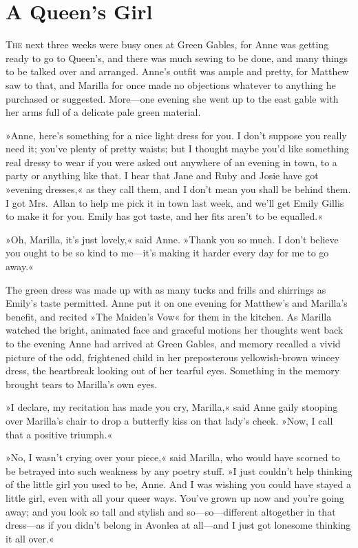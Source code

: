 \chapter{A Queen's Girl}

\lettrine[lines=4]{T}{he} next three weeks were busy ones at Green Gables, for Anne was getting ready to go to Queen's, and there was much sewing to be done, and many things to be talked over and arranged. Anne's outfit was ample and pretty, for Matthew saw to that, and Marilla for once made no objections whatever to anything he purchased or suggested. More—one evening she went up to the east gable with her arms full of a delicate pale green material.

»Anne, here's something for a nice light dress for you. I don't suppose you really need it; you've plenty of pretty waists; but I thought maybe you'd like something real dressy to wear if you were asked out anywhere of an evening in town, to a party or anything like that. I hear that Jane and Ruby and Josie have got »evening dresses,« as they call them, and I don't mean you shall be behind them. I got Mrs.~Allan to help me pick it in town last week, and we'll get Emily Gillis to make it for you. Emily has got taste, and her fits aren't to be equalled.«

»Oh, Marilla, it's just lovely,« said Anne. »Thank you so much. I don't believe you ought to be so kind to me—it's making it harder every day for me to go away.«

The green dress was made up with as many tucks and frills and shirrings as Emily's taste permitted. Anne put it on one evening for Matthew's and Marilla's benefit, and recited »The Maiden's Vow« for them in the kitchen. As Marilla watched the bright, animated face and graceful motions her thoughts went back to the evening Anne had arrived at Green Gables, and memory recalled a vivid picture of the odd, frightened child in her preposterous yellowish-brown wincey dress, the heartbreak looking out of her tearful eyes. Something in the memory brought tears to Marilla's own eyes.

»I declare, my recitation has made you cry, Marilla,« said Anne gaily stooping over Marilla's chair to drop a butterfly kiss on that lady's cheek. »Now, I call that a positive triumph.«

»No, I wasn't crying over your piece,« said Marilla, who would have scorned to be betrayed into such weakness by any poetry stuff. »I just couldn't help thinking of the little girl you used to be, Anne. And I was wishing you could have stayed a little girl, even with all your queer ways. You've grown up now and you're going away; and you look so tall and stylish and so—so—different altogether in that dress—as if you didn't belong in Avonlea at all—and I just got lonesome thinking it all over.«

